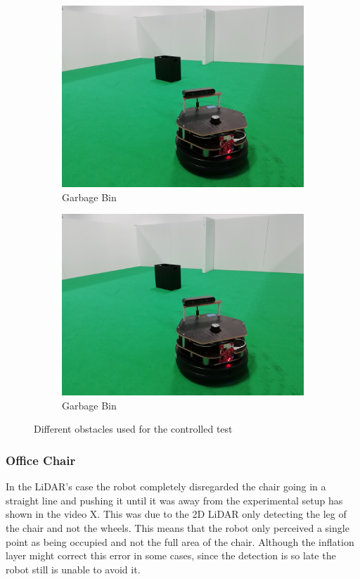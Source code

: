 \begin{figure}[h!]
\begin{subfigure}[b]{0.3\linewidth}
    \includegraphics[width=\linewidth]{imgs/chapter5/garbage.jpg}
    \caption{Garbage Bin}
    \label{fig::garbage}
  \end{subfigure}
  \begin{subfigure}[b]{0.3\linewidth}
    \includegraphics[width=\linewidth]{imgs/chapter5/garbage.jpg}
    \caption{Garbage Bin}
    \label{fig::garbage}
  \end{subfigure}
  \caption{Different obstacles used for the controlled test}
  \label{fig:obstacles}
\end{figure}
\subsubsection{Office Chair}
In the \ac{LiDAR}'s case  the robot completely disregarded the chair going in a straight line and pushing it until it was away from the experimental setup has shown in the video X. This was due to the 2D \ac{LiDAR} only detecting the leg of the chair and not the wheels. This means that the robot only perceived a single point as being occupied and not the full area of the chair. Although the inflation layer  might correct this error in some cases, since the detection is so late the robot still is unable to avoid it.

